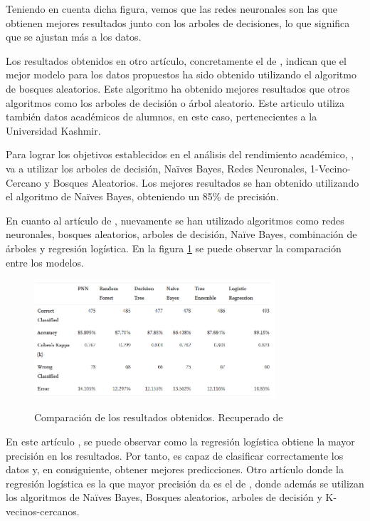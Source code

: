 Teniendo en cuenta dicha figura, vemos que las redes neuronales son las que obtienen mejores resultados junto con los arboles de decisiones, lo que significa que se ajustan más a los datos. 

Los resultados obtenidos en otro artículo, concretamente el de , indican que el mejor modelo para los datos propuestos ha sido obtenido utilizando el algoritmo de bosques aleatorios. Este algoritmo ha obtenido mejores resultados que otros algoritmos como los arboles de decisión o árbol aleatorio. Este articulo utiliza también datos académicos de alumnos, en este caso, pertenecientes a la Universidad Kashmir.

Para lograr los objetivos establecidos en el análisis del rendimiento académico, , va a utilizar los arboles de decisión, Naïves Bayes, Redes Neuronales, 1-Vecino-Cercano y Bosques Aleatorios. Los mejores resultados se han obtenido utilizando el algoritmo de Naïves Bayes, obteniendo un 85\% de precisión.

En cuanto al artículo de , nuevamente se han utilizado algoritmos como redes neuronales, bosques aleatorios, arboles de decisión, Naïve Bayes, combinación de árboles y regresión logística. En la figura \ref{fig:compResMod} se puede observar la comparación entre los modelos.

\begin{figure}[htb]
	\centering
	\caption{Comparación de los resultados obtenidos. Recuperado de \protect{}}
	\includegraphics[width=0.8\textwidth]{recursos/ComparacionModelos}
	\label{fig:compResMod}
\end{figure}

En este artículo , se puede observar como la regresión logística obtiene la mayor precisión en los resultados. Por tanto, es capaz de clasificar correctamente los datos y, en consiguiente, obtener mejores predicciones. Otro artículo donde la regresión logística es la que mayor precisión da es el de , donde además se utilizan los algoritmos de Naïves Bayes, Bosques aleatorios, arboles de decisión y K-vecinos-cercanos.



